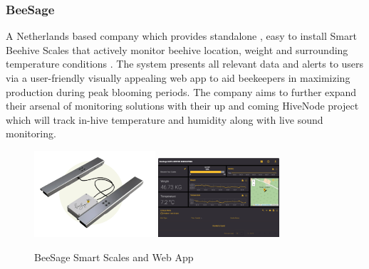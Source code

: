 \documentclass[12pt]{article}
\begin{document}
	\subsubsection{BeeSage}
	A Netherlands based company which provides standalone , easy to install Smart Beehive Scales that actively monitor beehive location, weight and surrounding temperature conditions \cite{Beesage}. The system presents all relevant data and alerts to users via a user-friendly visually appealing web app to aid beekeepers in maximizing production during peak blooming periods. The company aims to further expand their arsenal of monitoring solutions with their up and coming HiveNode project which will track in-hive temperature and humidity along with live sound monitoring.
	\begin{figure}[H]
		\centering
		\includegraphics[width=0.4\textwidth]{Images/Simillar/BeeSage_scales.png}
		\includegraphics[width=0.4\textwidth]{Images/Simillar/BeeSage App.png}
		\caption{BeeSage Smart Scales and Web App \cite{Beesage}}
		\label{fig:BEESAGE_SCALES}
	\end{figure}
	
\end{document}
